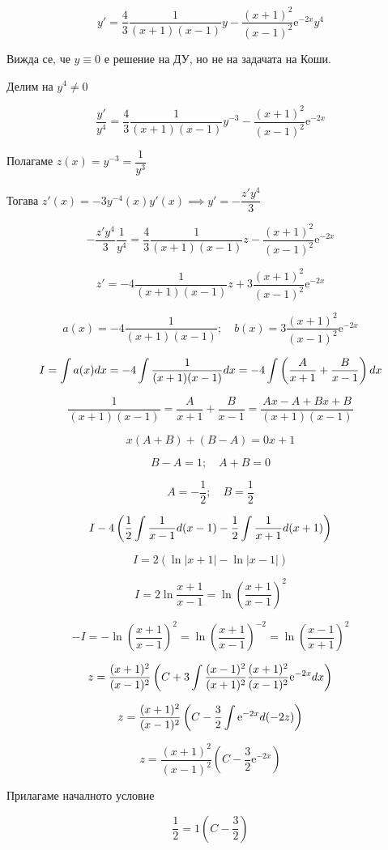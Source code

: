 \documentclass{scrartcl}
\begin{document}
$$y' = \dfrac{4}{3}\dfrac{1}{(x+1)(x-1)}y-\dfrac{(x+1)^2}{(x-1)^2}\mathrm{e}^{-2x}y^4$$

Вижда се, че $y\equiv 0$ е решение на ДУ, но не на задачата на Коши.

Делим на $y^4\ne 0$

$$\dfrac{y'}{y^4} = \dfrac{4}{3}\dfrac{1}{(x+1)(x-1)}y^{-3}-\dfrac{(x+1)^2}{(x-1)^2}\mathrm{e}^{-2x}$$

Полагаме $z(x) = y^{-3} = \dfrac{1}{y^3}$

Тогава $z'(x) = -3y^{-4}(x)y'(x) \implies y' = -\dfrac{z'y^4}{3}$

$$-\dfrac{z'y^4}{3}\dfrac{1}{y^4} = \dfrac{4}{3}\dfrac{1}{(x+1)(x-1)}z-\dfrac{(x+1)^2}{(x-1)^2}\mathrm{e}^{-2x}$$

$$z' = -4\dfrac{1}{(x+1)(x-1)}z+3\dfrac{(x+1)^2}{(x-1)^2}\mathrm{e}^{-2x}$$

$$a(x) = -4\dfrac{1}{(x+1)(x-1)}; \quad b(x) = 3\dfrac{(x+1)^2}{(x-1)^2}\mathrm{e}^{-2x}$$

$$\displaystyle I = \int a(x)\space dx = -4\int \dfrac{1}{(x+1)(x-1)}\space dx = -4\int\left(\dfrac{A}{x+1}+\dfrac{B}{x-1}\right)\space dx$$

$$\dfrac{1}{(x+1)(x-1)} = \dfrac{A}{x+1}+\dfrac{B}{x-1} = \dfrac{Ax-A+Bx+B}{(x+1)(x-1)}$$

$$x(A+B)+(B-A)=0x+1$$

$$B-A=1;\quad A+B=0$$

$$A=-\dfrac{1}{2};\quad B=\dfrac{1}{2}$$

$$\displaystyle I -4\left(\dfrac{1}{2}\int\dfrac{1}{x-1}\space d(x-1)-\dfrac{1}{2}\int\dfrac{1}{x+1}\space d(x+1)\right)$$

$$I = 2(\ln{|x+1|}-\ln{|x-1|})$$

$$I = 2 \ln{\dfrac{x+1}{x-1}} = \ln{\left(\dfrac{x+1}{x-1}\right)^2}$$

$$-I = -\ln{\left(\dfrac{x+1}{x-1}\right)^2} = \ln{\left(\dfrac{x+1}{x-1}\right)^{-2}} = \ln{\left(\dfrac{x-1}{x+1}\right)^2}$$

$$z=\dfrac{(x+1)^2}{(x-1)^2}\left(C+3\int\dfrac{(x-1)^2}{(x+1)^2}\dfrac{(x+1)^2}{(x-1)^2}\mathrm{e}^{-2x}\space dx\right)$$

$$z=\dfrac{(x+1)^2}{(x-1)^2}\left(C-\dfrac{3}{2}\int\mathrm{e}^{-2x}\space d(-2z)\right)$$

$$z=\dfrac{(x+1)^2}{(x-1)^2}\left(C-\dfrac{3}{2}\mathrm{e}^{-2x}\right)$$

Прилагаме началното условие

$$\dfrac{1}{2}=1\left(C-\dfrac{3}{2}\right)$$
\end{document}
